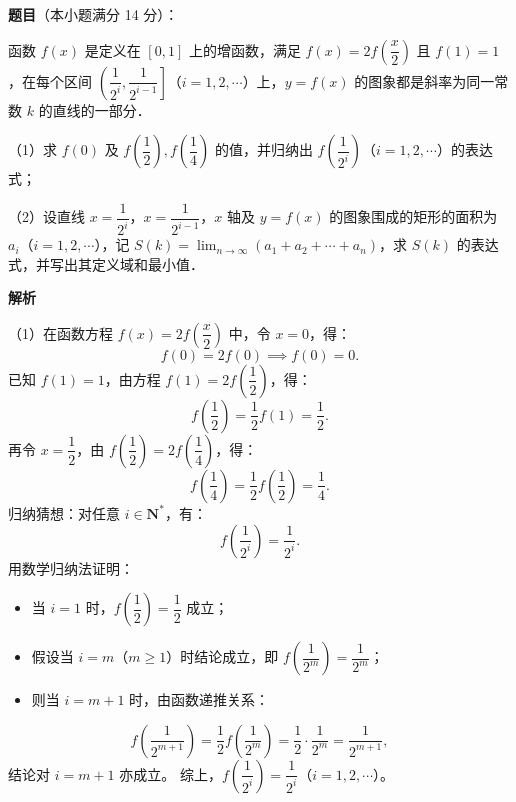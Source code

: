 \begin{answer}

\textbf{题目}（本小题满分 14 分）：

函数 $f(x)$ 是定义在 $[0, 1]$ 上的增函数，满足 $f(x)=2f\left(\dfrac{x}{2}\right)$ 且 $f(1)=1$，在每个区间 $\left(\dfrac{1}{2^i}, \dfrac{1}{2^{i-1}}\right]$（$i=1, 2, \cdots$）上，$y=f(x)$ 的图象都是斜率为同一常数 $k$ 的直线的一部分．

（1）求 $f(0)$ 及 $f\left(\dfrac{1}{2}\right), f\left(\dfrac{1}{4}\right)$ 的值，并归纳出 $f\left(\dfrac{1}{2^i}\right)$（$i=1, 2, \cdots$）的表达式；

（2）设直线 $x=\dfrac{1}{2^i}$，$x=\dfrac{1}{2^{i-1}}$，$x$ 轴及 $y=f(x)$ 的图象围成的矩形的面积为 $a_i$（$i=1, 2, \cdots$），记 $S(k)=\lim_{n\to\infty}(a_1+a_2+\cdots+a_n)$，求 $S(k)$ 的表达式，并写出其定义域和最小值．

\textbf{解析}

（1）在函数方程 $f(x)=2f\left(\dfrac{x}{2}\right)$ 中，令 $x=0$，得：
\nopagebreak[4]
\[
f(0)=2f(0)\implies f(0)=0.
\]
已知 $f(1)=1$，由方程 $f(1)=2f\left(\dfrac{1}{2}\right)$，得：
\nopagebreak[4]
\[
f\left(\frac{1}{2}\right)=\frac{1}{2}f(1)=\frac{1}{2}.
\]
再令 $x=\dfrac{1}{2}$，由 $f\left(\dfrac{1}{2}\right)=2f\left(\dfrac{1}{4}\right)$，得：
\nopagebreak[4]
\[
f\left(\frac{1}{4}\right)=\frac{1}{2}f\left(\frac{1}{2}\right)=\frac{1}{4}.
\]
归纳猜想：对任意 $i\in\mathbf{N}^*$，有：
\nopagebreak[4]
\[
f\left(\frac{1}{2^i}\right)=\frac{1}{2^i}.
\]
用数学归纳法证明：
\begin{itemize}
\item 当 $i=1$ 时，$f\left(\dfrac{1}{2}\right)=\dfrac{1}{2}$ 成立；
\item 假设当 $i=m$（$m\ge 1$）时结论成立，即 $f\left(\dfrac{1}{2^m}\right)=\dfrac{1}{2^m}$；
\item 则当 $i=m+1$ 时，由函数递推关系：
\end{itemize}
\nopagebreak[4]
\[
f\left(\frac{1}{2^{m+1}}\right)=\frac{1}{2}f\left(\frac{1}{2^m}\right)=\frac{1}{2}\cdot\frac{1}{2^m}=\frac{1}{2^{m+1}},
\]
结论对 $i=m+1$ 亦成立。
综上，$f\left(\dfrac{1}{2^i}\right)=\dfrac{1}{2^i}$（$i=1, 2, \cdots$）。


\end{answer}
